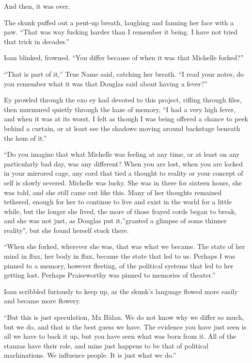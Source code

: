 And then, it was over.

The skunk puffed out a pent-up breath, laughing and fanning her face with a paw. ``That was way fucking harder than I remember it being. I have not tried that trick in decades.''

Ioan blinked, frowned. ``You differ because of when it was that Michelle forked?''

``That is part of it,'' True Name said, catching her breath. ``I read your notes, do you remember what it was that Douglas said about having a fever?''

Ey prowled through the exo ey had devoted to this project, rifling through files, then murmured quietly through the haze of memory, ``I had a very high fever, and when it was at its worst, I felt as though I was being offered a chance to peek behind a curtain, or at least see the shadows moving around backstage beneath the hem of it.''

``Do you imagine that what Michelle was feeling at any time, or at least on any particularly bad day, was any different? When you are lost, when you are locked in your mirrored cage, any cord that tied a thought to reality or your concept of self is slowly severed. Michelle was lucky. She was in there for sixteen hours, she was told, and she still came out like this. Many of her thoughts remained tethered, enough for her to continue to live and exist in the world for a little while, but the longer she lived, the more of those frayed cords began to break, and she was not just, as Douglas put it,''granted a glimpse of some thinner reality", but she found herself stuck there.

``When she forked, wherever she was, that was what we became. The state of her mind in flux, her body in flux, became the state that led to us. Perhaps I was pinned to a memory, however fleeting, of the political systems that led to her getting lost. Perhaps Praiseworthy was pinned to memories of theater.''

Ioan scribbled furiously to keep up, as the skunk's language flowed more easily and became more flowery.

``But this is just speculation, Mx Bălan. We do not know why we differ so much, but we do, and that is the best guess we have. The evidence you have just seen is all we have to back it up, but you have seen what was born from it. All of the stanzas have their role, and mine just happens to be that of political machinations. We influence people. It is just what we do.''

